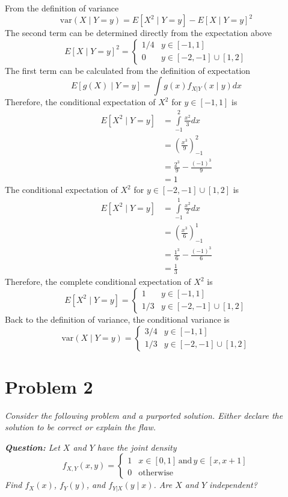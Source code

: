 \documentclass{article}
\begin{document}
From the definition of variance
$$ \mathrm{var}(X \mid Y = y) = E[X^2 \mid Y = y] - E[X \mid Y = y]^2 $$
The second term can be determined directly from the expectation above
$$ E[X \mid Y = y]^2 = \begin{cases}
    1/4 & y \in [-1, 1] \\
    0 & y \in [-2, -1] \cup [1, 2]
\end{cases} $$
The first term can be calculated from the definition of expectation
$$ E[g(X) \mid Y = y] = \int g(x) f_{X|Y}(x \mid y) dx $$
Therefore, the conditional expectation of $X^2$ for $y \in [-1, 1]$ is
\begin{align*}
    E[X^2 \mid Y = y] &= \int\limits_{-1}^2 \frac{x^2}{3} dx \\
    &= \left( \frac{x^3}{9} \right)_{-1}^2 \\
    &= \frac{2^3}{9} - \frac{(-1)^3}{9} \\
    &= 1
\end{align*}
The conditional expectation of $X^2$ for $y \in [-2, -1] \cup [1, 2]$ is
\begin{align*}
    E[X^2 \mid Y = y] &= \int\limits_{-1}^1 \frac{x^2}{2} dx \\
    &= \left( \frac{x^3}{6} \right)_{-1}^1 \\
    &= \frac{1^3}{6} - \frac{(-1)^3}{6} \\
    &= \frac{1}{3}
\end{align*}
Therefore, the complete conditional expectation of $X^2$ is
$$ E[X^2 \mid Y = y] = \begin{cases}
    1 & y \in [-1, 1] \\
    1/3 & y \in [-2, -1] \cup [1, 2]
\end{cases} $$
Back to the definition of variance, the conditional variance is
$$ \mathrm{var}(X \mid Y = y) = \begin{cases}
    3/4 & y \in [-1, 1] \\
    1/3 & y \in [-2, -1] \cup [1, 2]
\end{cases} $$

\section*{Problem 2}

\textit{Consider the following problem and a purported solution. Either
declare the solution to be correct or explain the flaw.}

\bigbreak

\textit{\textbf{Question:} Let $X$ and $Y$ have the joint density}
$$ f_{X,Y}(x, y) = \begin{cases}
    1 & x \in [0, 1]\, \mathrm{and}\, y \in [x, x + 1] \\
    0 & \mathrm{otherwise}
\end{cases} $$
\textit{Find $f_X(x)$, $f_Y(y)$, and $f_{Y|X}(y \mid x)$. Are $X$ and $Y$
independent?}
\end{document}
